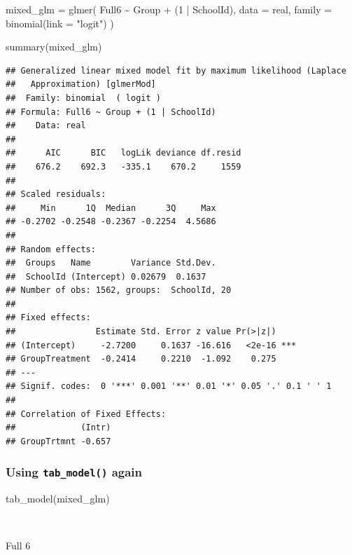 \documentclass[
]{book}
\newenvironment{Shaded}{\begin{snugshade}}{\end{snugshade}}
\newcommand{\AttributeTok}[1]{\textcolor[rgb]{0.77,0.63,0.00}{#1}}
\newcommand{\DecValTok}[1]{\textcolor[rgb]{0.00,0.00,0.81}{#1}}
\newcommand{\FunctionTok}[1]{\textcolor[rgb]{0.00,0.00,0.00}{#1}}
\newcommand{\NormalTok}[1]{#1}
\newcommand{\OtherTok}[1]{\textcolor[rgb]{0.56,0.35,0.01}{#1}}
\newcommand{\SpecialCharTok}[1]{\textcolor[rgb]{0.00,0.00,0.00}{#1}}
\newcommand{\StringTok}[1]{\textcolor[rgb]{0.31,0.60,0.02}{#1}}
\begin{document}
\begin{Shaded}
\begin{Highlighting}[]
\NormalTok{mixed\_glm }\OtherTok{=} \FunctionTok{glmer}\NormalTok{(}
\NormalTok{  Full6 }\SpecialCharTok{\textasciitilde{}}\NormalTok{ Group }\SpecialCharTok{+}\NormalTok{ (}\DecValTok{1} \SpecialCharTok{|}\NormalTok{ SchoolId),}
  \AttributeTok{data =}\NormalTok{ real,}
  \AttributeTok{family =} \FunctionTok{binomial}\NormalTok{(}\AttributeTok{link =} \StringTok{"logit"}\NormalTok{)}
\NormalTok{)}

\FunctionTok{summary}\NormalTok{(mixed\_glm)}
\end{Highlighting}
\end{Shaded}

\begin{verbatim}
## Generalized linear mixed model fit by maximum likelihood (Laplace
##   Approximation) [glmerMod]
##  Family: binomial  ( logit )
## Formula: Full6 ~ Group + (1 | SchoolId)
##    Data: real
## 
##      AIC      BIC   logLik deviance df.resid 
##    676.2    692.3   -335.1    670.2     1559 
## 
## Scaled residuals: 
##     Min      1Q  Median      3Q     Max 
## -0.2702 -0.2548 -0.2367 -0.2254  4.5686 
## 
## Random effects:
##  Groups   Name        Variance Std.Dev.
##  SchoolId (Intercept) 0.02679  0.1637  
## Number of obs: 1562, groups:  SchoolId, 20
## 
## Fixed effects:
##                Estimate Std. Error z value Pr(>|z|)    
## (Intercept)     -2.7200     0.1637 -16.616   <2e-16 ***
## GroupTreatment  -0.2414     0.2210  -1.092    0.275    
## ---
## Signif. codes:  0 '***' 0.001 '**' 0.01 '*' 0.05 '.' 0.1 ' ' 1
## 
## Correlation of Fixed Effects:
##             (Intr)
## GroupTrtmnt -0.657
\end{verbatim}

\hypertarget{using-tab_model-again}{%
\subsubsection{\texorpdfstring{Using \texttt{tab\_model()} again}{Using tab\_model() again}}\label{using-tab_model-again}}

\begin{Shaded}
\begin{Highlighting}[]
\FunctionTok{tab\_model}\NormalTok{(mixed\_glm)}
\end{Highlighting}
\end{Shaded}

~

Full 6
\end{document}
